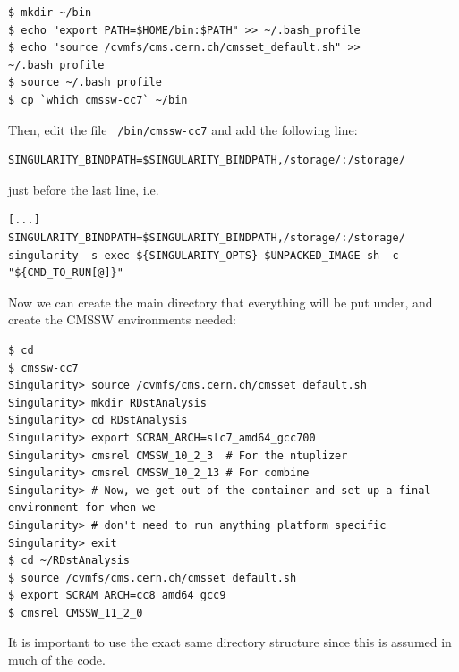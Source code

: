 \documentclass[12pt]{report}
\begin{document}
\begin{mdframed}[backgroundcolor=light-gray, roundcorner=10pt,leftmargin=1, rightmargin=1, innerleftmargin=15, innertopmargin=15,innerbottommargin=15, outerlinewidth=1, linecolor=light-gray,roundcorner=20pt]
\begin{lstlisting}
$ mkdir ~/bin
$ echo "export PATH=$HOME/bin:$PATH" >> ~/.bash_profile
$ echo "source /cvmfs/cms.cern.ch/cmsset_default.sh" >> ~/.bash_profile
$ source ~/.bash_profile
$ cp `which cmssw-cc7` ~/bin
\end{lstlisting}
\end{mdframed}

Then, edit the file \texttt{~/bin/cmssw-cc7} and add the following line:

\begin{mdframed}[backgroundcolor=light-gray, roundcorner=10pt,leftmargin=1, rightmargin=1, innerleftmargin=15, innertopmargin=15,innerbottommargin=15, outerlinewidth=1, linecolor=light-gray,roundcorner=20pt]
\begin{lstlisting}
SINGULARITY_BINDPATH=$SINGULARITY_BINDPATH,/storage/:/storage/
\end{lstlisting}
\end{mdframed}

just before the last line, i.e.

\begin{mdframed}[backgroundcolor=light-gray, roundcorner=10pt,leftmargin=1, rightmargin=1, innerleftmargin=15, innertopmargin=15,innerbottommargin=15, outerlinewidth=1, linecolor=light-gray,roundcorner=20pt]
\begin{lstlisting}
[...]
SINGULARITY_BINDPATH=$SINGULARITY_BINDPATH,/storage/:/storage/
singularity -s exec ${SINGULARITY_OPTS} $UNPACKED_IMAGE sh -c "${CMD_TO_RUN[@]}"
\end{lstlisting}
\end{mdframed}

Now we can create the main directory that everything will be put under, and
create the CMSSW environments needed:
\begin{mdframed}[backgroundcolor=light-gray, roundcorner=10pt,leftmargin=1, rightmargin=1, innerleftmargin=15, innertopmargin=15,innerbottommargin=15, outerlinewidth=1, linecolor=light-gray,roundcorner=20pt]
\begin{lstlisting}
$ cd
$ cmssw-cc7
Singularity> source /cvmfs/cms.cern.ch/cmsset_default.sh
Singularity> mkdir RDstAnalysis
Singularity> cd RDstAnalysis
Singularity> export SCRAM_ARCH=slc7_amd64_gcc700
Singularity> cmsrel CMSSW_10_2_3  # For the ntuplizer
Singularity> cmsrel CMSSW_10_2_13 # For combine
Singularity> # Now, we get out of the container and set up a final environment for when we
Singularity> # don't need to run anything platform specific
Singularity> exit
$ cd ~/RDstAnalysis
$ source /cvmfs/cms.cern.ch/cmsset_default.sh
$ export SCRAM_ARCH=cc8_amd64_gcc9
$ cmsrel CMSSW_11_2_0
\end{lstlisting}
\end{mdframed}
It is important to use the exact same directory structure since this is assumed
in much of the code.
\end{document}
